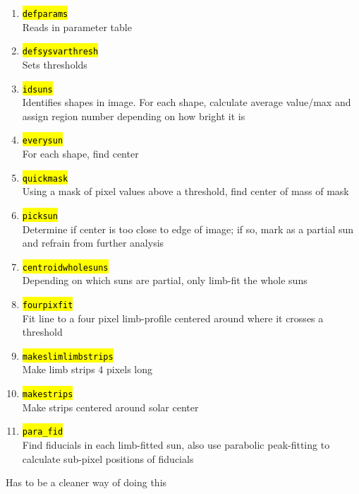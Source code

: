 \documentclass[10pt]{scrartcl}
\begin{document}
\begin{enumerate}
    \item \hl{\texttt{defparams}}\\
        Reads in parameter table
    \item \hl{\texttt{defsysvarthresh}}\\
        Sets thresholds
    \item \hl{\texttt{idsuns}}\\
        Identifies shapes in image. For each shape, calculate average value/max and assign region number depending on how bright it is
    \item \hl{\texttt{everysun}}\\
        For each shape, find center 
    \item \hl{\texttt{quickmask}}\\
        Using a mask of pixel values above a threshold, find center of mass of mask
    \item \hl{\texttt{picksun}}\\
        Determine if center is too close to edge of image; if so, mark as a partial sun and refrain from further analysis
    \item \hl{\texttt{centroidwholesuns}}\\
        Depending on which suns are partial, only limb-fit the whole suns
    \item \hl{\texttt{fourpixfit}}\\
        Fit line to a four pixel limb-profile centered around where it crosses a threshold
    \item \hl{\texttt{makeslimlimbstrips}}\\
        Make limb strips 4 pixels long 
    \item \hl{\texttt{makestrips}}\\
        Make strips centered around solar center
    \item \hl{\texttt{para\_fid}}\\
        Find fiducials in each limb-fitted sun, also use parabolic peak-fitting to calculate sub-pixel positions of fiducials
\end{enumerate}

Has to be a cleaner way of doing this
\end{document}
